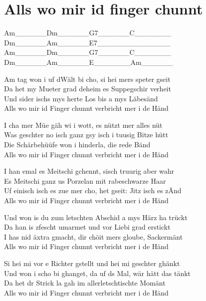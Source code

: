 \documentclass[
  letterpaper,
]{scrbook}
\begin{document}
\hypertarget{alls-wo-mir-id-finger-chunnt}{%
\chapter{Alls wo mir id finger
chunnt}\label{alls-wo-mir-id-finger-chunnt}}

\textbar Am\_\_\_\_\_\_\textbar Dm\_\_\_\_\_\_\textbar G7\_\_\_\_\_\_\textbar C\_\_\_\_\_\_\_\textbar{}\\
\textbar Dm\_\_\_\_\_\_\textbar Am\_\_\_\_\_\_\textbar E7\_\_\_\_\_\_\textbar\_\_\_\_\_\_\_\_\textbar{}\\
\textbar Am\_\_\_\_\_\_\textbar Dm\_\_\_\_\_\_\textbar G7\_\_\_\_\_\_\textbar C\_\_\_\_\_\_\_\textbar{}\\
\textbar Dm\_\_\_\_\_\_\textbar Am\_\_\_\_\_\_\textbar E\_\_\_\_\_\_\_\textbar Am\_\_\_\_\_\_\textbar{}

Am tag won i uf d\textquotesingle Wält bi cho, si hei mers speter
gseit\\
Da het my Mueter grad deheim es Suppegschir verheit\\
Und sider ischs mys herte Los bis a mys Läbesänd\\
Alls wo mir id Finger chunnt verbricht mer i de Händ

I cha mer Müe gäh wi i wott, es nützt mer alles nüt\\
Was geschter no isch ganz gsy isch i tuusig Bitze hütt\\
Die Schärbehüüfe won i hinderla, die rede Bänd\\
Alls wo mir id Finger chunnt verbricht mer i de Händ

I han emal es Meitschi gchennt, s\textquotesingle isch truurig aber
wahr\\
Es Meitschi ganz us Porzelan mit rabeschwarze Haar\\
Uf einisch isch es zue mer cho, het gseit: Jitz isch es
z\textquotesingle Änd\\
Alls wo mir id Finger chunnt verbricht mer i de Händ

Und won i\textquotesingle s du zum letschten Abschid a mys Härz ha
trückt\\
Da han i\textquotesingle s z\textquotesingle fescht umarmet und vor
Liebi grad erstickt\\
I has nid äxtra gmacht, dir chöit mers gloube, Sackermänt\\
Alls wo mir id Finger chunnt verbricht mer i de Händ

Si hei mi vor e Richter gstellt und hei mi geschter ghänkt\\
Und won i scho bi ghanget, da uf ds Mal, wär hätt das tänkt\\
Da het dr Strick la gah im allerletschtischte Momänt\\
Alls wo mir id Finger chunnt verbricht mer i de Händ
\end{document}
